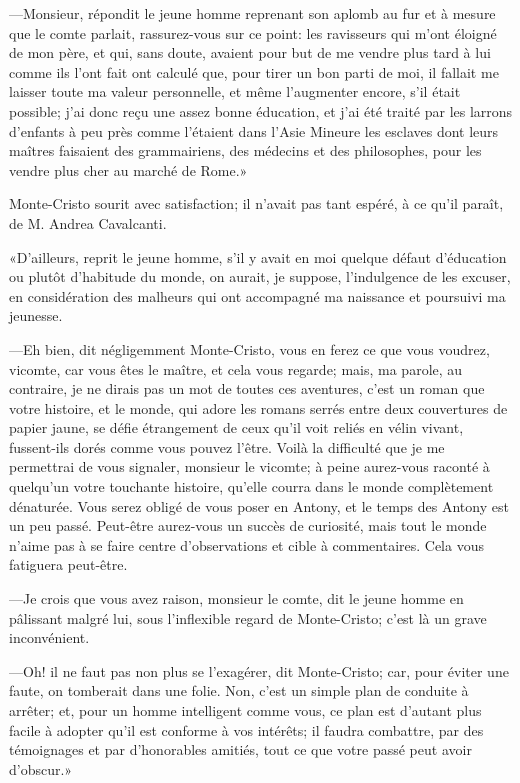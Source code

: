 —Monsieur, répondit le jeune homme reprenant son aplomb au fur et à mesure que le comte parlait, rassurez-vous sur ce point: les ravisseurs qui m'ont éloigné de mon père, et qui, sans doute, avaient pour but de me vendre plus tard à lui comme ils l'ont fait ont calculé que, pour tirer un bon parti de moi, il fallait me laisser toute ma valeur personnelle, et même l'augmenter encore, s'il était possible; j'ai donc reçu une assez bonne éducation, et j'ai été traité par les larrons d'enfants à peu près comme l'étaient dans l'Asie Mineure les esclaves dont leurs maîtres faisaient des grammairiens, des médecins et des philosophes, pour les vendre plus cher au marché de Rome.» 

Monte-Cristo sourit avec satisfaction; il n'avait pas tant espéré, à ce qu'il paraît, de M. Andrea Cavalcanti. 

«D'ailleurs, reprit le jeune homme, s'il y avait en moi quelque défaut d'éducation ou plutôt d'habitude du monde, on aurait, je suppose, l'indulgence de les excuser, en considération des malheurs qui ont accompagné ma naissance et poursuivi ma jeunesse. 

—Eh bien, dit négligemment Monte-Cristo, vous en ferez ce que vous voudrez, vicomte, car vous êtes le maître, et cela vous regarde; mais, ma parole, au contraire, je ne dirais pas un mot de toutes ces aventures, c'est un roman que votre histoire, et le monde, qui adore les romans serrés entre deux couvertures de papier jaune, se défie étrangement de ceux qu'il voit reliés en vélin vivant, fussent-ils dorés comme vous pouvez l'être. Voilà la difficulté que je me permettrai de vous signaler, monsieur le vicomte; à peine aurez-vous raconté à quelqu'un votre touchante histoire, qu'elle courra dans le monde complètement dénaturée. Vous serez obligé de vous poser en Antony, et le temps des Antony est un peu passé. Peut-être aurez-vous un succès de curiosité, mais tout le monde n'aime pas à se faire centre d'observations et cible à commentaires. Cela vous fatiguera peut-être. 

—Je crois que vous avez raison, monsieur le comte, dit le jeune homme en pâlissant malgré lui, sous l'inflexible regard de Monte-Cristo; c'est là un grave inconvénient. 

—Oh! il ne faut pas non plus se l'exagérer, dit Monte-Cristo; car, pour éviter une faute, on tomberait dans une folie. Non, c'est un simple plan de conduite à arrêter; et, pour un homme intelligent comme vous, ce plan est d'autant plus facile à adopter qu'il est conforme à vos intérêts; il faudra combattre, par des témoignages et par d'honorables amitiés, tout ce que votre passé peut avoir d'obscur.» 

